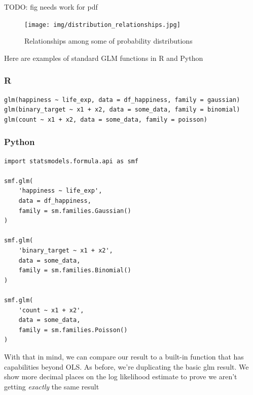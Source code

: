 \documentclass[
  letterpaper,
]{krantz}
\newcommand{\blandscape}{\begin{landscape}}
\newcommand{\elandscape}{\end{landscape}}
\begin{document}
TODO: fig needs work for pdf

\newpage

\blandscape

\begin{figure}[H]

{\centering \texttt{[image: img/distribution\_relationships.jpg]}

}

\caption{Relationships among some of probability distributions}

\end{figure}%

\elandscape

\newpage

Here are examples of standard GLM functions in R and Python

\subsubsection{R}

\begin{verbatim}
glm(happiness ~ life_exp, data = df_happiness, family = gaussian)
glm(binary_target ~ x1 + x2, data = some_data, family = binomial)
glm(count ~ x1 + x2, data = some_data, family = poisson)
\end{verbatim}

\subsubsection{Python}

\begin{verbatim}
import statsmodels.formula.api as smf

smf.glm(
    'happiness ~ life_exp', 
    data = df_happiness, 
    family = sm.families.Gaussian()
)

smf.glm(
    'binary_target ~ x1 + x2', 
    data = some_data, 
    family = sm.families.Binomial()
)

smf.glm(
    'count ~ x1 + x2', 
    data = some_data, 
    family = sm.families.Poisson()
)
\end{verbatim}

With that in mind, we can compare our result to a built-in function that
has capabilities beyond OLS. As before, we're duplicating the basic glm
result. We show more decimal places on the log likelihood estimate to
prove we aren't getting \emph{exactly} the same result

\setlength{\LTpost}{0mm}
\end{document}
